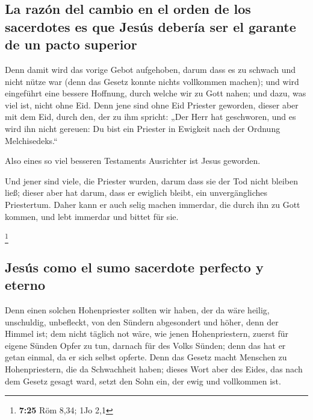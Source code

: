 \hypertarget{la-razuxf3n-del-cambio-en-el-orden-de-los-sacerdotes-es-que-jesuxfas-deberuxeda-ser-el-garante-de-un-pacto-superior}{%
\subsection{La razón del cambio en el orden de los sacerdotes es que
Jesús debería ser el garante de un pacto
superior}\label{la-razuxf3n-del-cambio-en-el-orden-de-los-sacerdotes-es-que-jesuxfas-deberuxeda-ser-el-garante-de-un-pacto-superior}}

 Denn damit wird das vorige Gebot aufgehoben, darum dass
es zu schwach und nicht nütze war  (denn das Gesetz
konnte nichts vollkommen machen); und wird eingeführt eine bessere
Hoffnung, durch welche wir zu Gott nahen;  und dazu, was
viel ist, nicht ohne Eid. Denn jene sind ohne Eid Priester geworden,
 dieser aber mit dem Eid, durch den, der zu ihm spricht:
„Der Herr hat geschworen, und es wird ihn nicht gereuen: Du bist ein
Priester in Ewigkeit nach der Ordnung Melchisedeks.``

 Also eines so viel besseren Testaments Ausrichter ist
Jesus geworden.

 Und jener sind viele, die Priester wurden, darum dass
sie der Tod nicht bleiben ließ;  dieser aber hat darum,
dass er ewiglich bleibt, ein unvergängliches Priestertum.
 Daher kann er auch selig machen immerdar, die durch ihn
zu Gott kommen, und lebt immerdar und bittet für sie.

\footnote{\textbf{7:25} Röm 8,34; 1Jo 2,1}

\hypertarget{jesuxfas-como-el-sumo-sacerdote-perfecto-y-eterno}{%
\subsection{Jesús como el sumo sacerdote perfecto y
eterno}\label{jesuxfas-como-el-sumo-sacerdote-perfecto-y-eterno}}

 Denn einen solchen Hohenpriester sollten wir haben, der
da wäre heilig, unschuldig, unbefleckt, von den Sündern abgesondert und
höher, denn der Himmel ist;  dem nicht täglich not wäre,
wie jenen Hohenpriestern, zuerst für eigene Sünden Opfer zu tun, darnach
für des Volks Sünden; denn das hat er getan einmal, da er sich selbst
opferte.  Denn das Gesetz macht Menschen zu
Hohenpriestern, die da Schwachheit haben; dieses Wort aber des Eides,
das nach dem Gesetz gesagt ward, setzt den Sohn ein, der ewig und
vollkommen ist.

